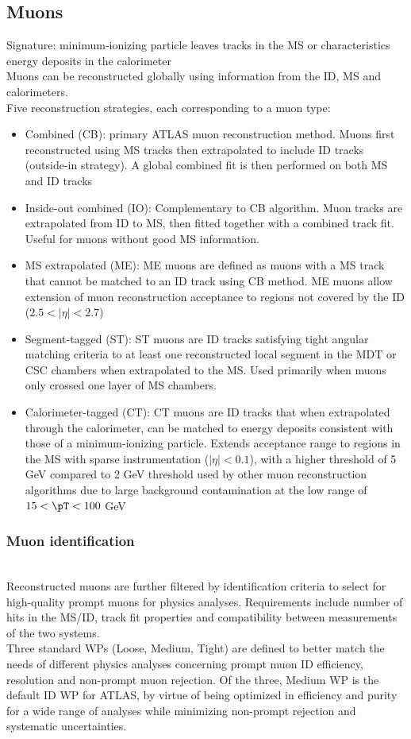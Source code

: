 \documentclass[../thesis.tex]{subfiles}
\begin{document}
\subsection{Muons}
Signature: minimum-ionizing particle leaves tracks in the MS or characteristics energy deposits in the calorimeter\\
Muons can be reconstructed globally using information from the ID, MS and calorimeters.\\
Five reconstruction strategies, each corresponding to a muon type:
\begin{itemize}
\item Combined (CB): primary ATLAS muon reconstruction method. Muons first reconstructed using MS tracks then extrapolated to include ID tracks (outside-in strategy). A global combined fit is then performed on both MS and ID tracks
\item Inside-out combined (IO): Complementary to CB algorithm. Muon tracks are extrapolated from ID to MS, then fitted together with a combined track fit. Useful for muons without good MS information.
\item MS extrapolated (ME): ME muons are defined as muons with a MS track that cannot be matched to an ID track using CB method. ME muons allow extension of muon reconstruction acceptance to regions not covered by the ID ($2.5<|\eta|<2.7$)
\item Segment-tagged (ST): ST muons are ID tracks satisfying tight angular matching criteria to at least one reconstructed local segment in the MDT or CSC chambers when extrapolated to the MS. Used primarily when muons only crossed one layer of MS chambers.
\item Calorimeter-tagged (CT): CT muons are ID tracks that when extrapolated through the calorimeter, can be matched to energy deposits consistent with those of a minimum-ionizing particle. Extends acceptance range to regions in the MS with sparse instrumentation ($|\eta|<0.1$), with a higher \pT threshold of 5 GeV compared to 2 GeV threshold used by other muon reconstruction algorithms due to large background contamination at the low \pT range of $15 < \pT < 100$ GeV
\end{itemize}
\subsubsection*{Muon identification}
\citep{reco:muon_ID}\citep{reco:muon_ID2}\\
Reconstructed muons are further filtered by identification criteria to select for high-quality prompt muons for physics analyses. Requirements include number of hits in the MS/ID, track fit properties and compatibility between measurements of the two systems.\\
Three standard WPs (Loose, Medium, Tight) are defined to better match the needs of different physics analyses concerning prompt muon ID efficiency, \pT resolution and non-prompt muon rejection. Of the three, Medium WP is the default ID WP for ATLAS, by virtue of being optimized in efficiency and purity for a wide range of analyses while minimizing non-prompt rejection and systematic uncertainties\citep{reco:muon_ID}.\\
\end{document}
